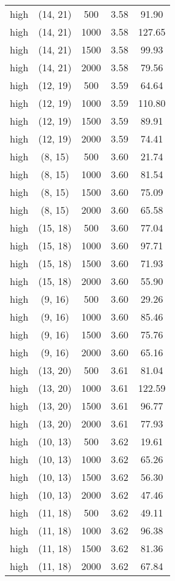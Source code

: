\begin{tabular}{c c c c c}
high & (14, 21) &  500 & 3.58 & 91.90 \\
high & (14, 21) &  1000 & 3.58 & 127.65 \\
high & (14, 21) &  1500 & 3.58 & 99.93 \\
high & (14, 21) &  2000 & 3.58 & 79.56 \\
high & (12, 19) &  500 & 3.59 & 64.64 \\
high & (12, 19) &  1000 & 3.59 & 110.80 \\
high & (12, 19) &  1500 & 3.59 & 89.91 \\
high & (12, 19) &  2000 & 3.59 & 74.41 \\
high & (8, 15) &  500 & 3.60 & 21.74 \\
high & (8, 15) &  1000 & 3.60 & 81.54 \\
high & (8, 15) &  1500 & 3.60 & 75.09 \\
high & (8, 15) &  2000 & 3.60 & 65.58 \\
high & (15, 18) &  500 & 3.60 & 77.04 \\
high & (15, 18) &  1000 & 3.60 & 97.71 \\
high & (15, 18) &  1500 & 3.60 & 71.93 \\
high & (15, 18) &  2000 & 3.60 & 55.90 \\
high & (9, 16) &  500 & 3.60 & 29.26 \\
high & (9, 16) &  1000 & 3.60 & 85.46 \\
high & (9, 16) &  1500 & 3.60 & 75.76 \\
high & (9, 16) &  2000 & 3.60 & 65.16 \\
high & (13, 20) &  500 & 3.61 & 81.04 \\
high & (13, 20) &  1000 & 3.61 & 122.59 \\
high & (13, 20) &  1500 & 3.61 & 96.77 \\
high & (13, 20) &  2000 & 3.61 & 77.93 \\
high & (10, 13) &  500 & 3.62 & 19.61 \\
high & (10, 13) &  1000 & 3.62 & 65.26 \\
high & (10, 13) &  1500 & 3.62 & 56.30 \\
high & (10, 13) &  2000 & 3.62 & 47.46 \\
high & (11, 18) &  500 & 3.62 & 49.11 \\
high & (11, 18) &  1000 & 3.62 & 96.38 \\
high & (11, 18) &  1500 & 3.62 & 81.36 \\
high & (11, 18) &  2000 & 3.62 & 67.84 \\

\end{tabular}
